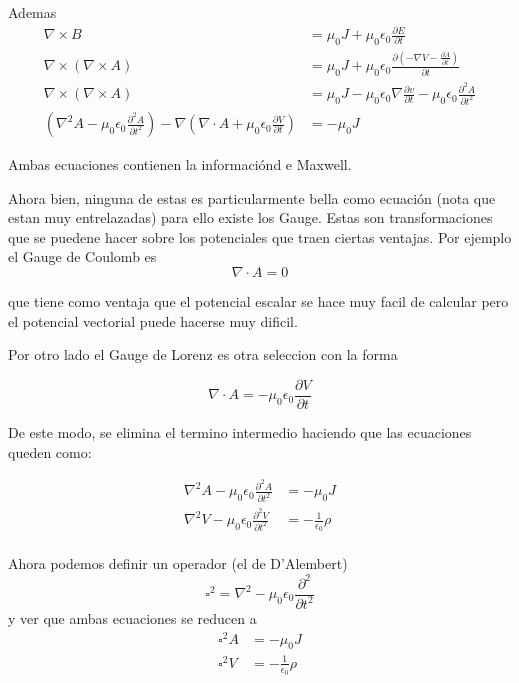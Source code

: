 \documentclass[12pt]{amsart}
\begin{document}
  Ademas
  \begin{align*}
    \nabla \times B &= \mu_0 J + \mu_0 \epsilon_0 \frac{\partial E}{\partial t}\\
    \nabla \times (\nabla \times A) &= \mu_0 J + \mu_0 \epsilon_0 \frac{\partial (- \nabla V - \frac{\partial A}{\partial t})}{\partial t}\\
    \nabla \times (\nabla \times A) &= \mu_0 J - \mu_0 \epsilon_0 \nabla \frac{\partial v}{\partial t} - \mu_0\epsilon_0 \frac{\partial^2 A}{\partial t^2}\\
    \left(\nabla^2 A - \mu_0 \epsilon_0 \frac{\partial^2 A}{\partial t^2}\right) - \nabla\left(\nabla \cdot A + \mu_0 \epsilon_0 \frac{\partial V}{\partial t}\right) &= - \mu_0 J
  \end{align*}

  Ambas ecuaciones contienen la informaciónd e Maxwell.

  Ahora bien, ninguna de estas es particularmente bella como ecuación (nota que estan muy entrelazadas) para ello existe los Gauge. Estas son transformaciones que se puedene hacer sobre los potenciales que traen ciertas ventajas. Por ejemplo el Gauge de Coulomb es 
  $$\nabla \cdot A = 0$$

que tiene como ventaja que el potencial escalar se hace muy facil de calcular pero el potencial vectorial puede hacerse muy dificil.

Por otro lado el Gauge de Lorenz es otra seleccion con la forma

  $$\nabla \cdot A = - \mu_0\epsilon_0 \frac{\partial V}{\partial t}$$

  De este modo, se elimina el termino intermedio haciendo que las ecuaciones queden como:

  \begin{align*}
    \nabla^2 A - \mu_0 \epsilon_0 \frac{\partial^2 A}{\partial t^2} &= - \mu_0 J\\
    \nabla^2 V - \mu_0\epsilon_0 \frac{\partial^2 V}{\partial t^2} &= - \frac{1}{\epsilon_0}\rho\\
  \end{align*}

  Ahora podemos definir un operador (el de D'Alembert) $$\square^2 = \nabla^2 - \mu_0\epsilon_0 \frac{\partial^2}{\partial t^2}$$ y ver que ambas ecuaciones se reducen a
  \begin{align*}
    \square^2 A &= - \mu_0 J\\
    \square^2 V &= - \frac{1}{\epsilon_0}\rho\\
  \end{align*}
\end{document}
